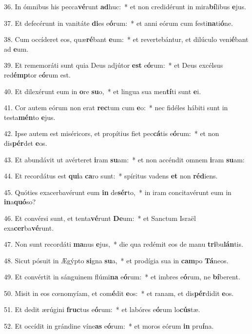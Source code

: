 36. In ómnibus his pecca\textbf{vé}runt \textbf{ad}huc:~*  et non credidérunt in mira\textbf{bí}libus \textbf{e}jus.\

37. Et defecérunt in vanitáte \textbf{di}es e\textbf{ó}rum:~*  et anni eórum cum festi\textbf{na}ti\textbf{ó}ne.\

38. Cum occíderet eos, quæ\textbf{ré}bant \textbf{e}um:~*  et revertebántur, et dilúculo veni\textbf{é}bant ad \textbf{e}um.\

39. Et rememoráti sunt quia Deus adjútor \textbf{est} e\textbf{ó}rum:~*  et Deus excélsus red\textbf{émp}tor e\textbf{ó}rum est.\

40. Et dilexérunt eum in \textbf{o}re \textbf{su}o,~*  et lingua sua men\textbf{tí}ti sunt \textbf{e}i.\

41. Cor autem eórum non erat \textbf{rec}tum cum \textbf{e}o:~*  nec fidéles hábiti sunt in testa\textbf{mén}to \textbf{e}jus.\

42. Ipse autem est miséricors, et propítius fiet pec\textbf{cá}tis e\textbf{ó}rum:~*  et non dis\textbf{pér}det \textbf{e}os.\

43. Et abundávit ut avérteret \textbf{i}ram \textbf{su}am:~*  et non accéndit omnem \textbf{i}ram \textbf{su}am:\

44. Et recordátus est \textbf{qui}a \textbf{ca}ro sunt:~*  spíritus vadens \textbf{et} non \textbf{réd}iens.\

45. Quóties exacerbavérunt eum \textbf{in} de\textbf{sér}to,~*  in iram concitavérunt eum in \textbf{in}a\textbf{quó}so?\

46. Et convérsi sunt, et tenta\textbf{vé}runt \textbf{De}um:~*  et Sanctum Israël exa\textbf{cer}ba\textbf{vé}runt.\

47. Non sunt recordáti \textbf{ma}nus \textbf{e}jus,~*  die qua redémit eos de manu \textbf{tri}bu\textbf{lán}tis.\

48. Sicut pósuit in Ægýpto \textbf{si}gna \textbf{su}a,~*  et prodígia sua in \textbf{cam}po \textbf{Tá}neos.\

49. Et convértit in sánguinem flúmi\textbf{na} e\textbf{ó}rum:~*  et imbres e\textbf{ó}rum, ne \textbf{bí}berent.\

50. Misit in eos cœnomyíam, et com\textbf{é}dit \textbf{e}os:~*  et ranam, et dis\textbf{pér}didit \textbf{e}os.\

51. Et dedit ærúgini \textbf{fruc}tus e\textbf{ó}rum:~*  et labóres e\textbf{ó}rum lo\textbf{cús}tæ.\

52. Et occídit in grándine víne\textbf{as} e\textbf{ó}rum:~*  et moros eórum \textbf{in} pru\textbf{í}na.\

